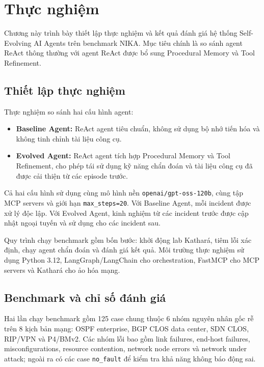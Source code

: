 \chapter{Thực nghiệm}
\label{chap:experiments}

Chương này trình bày thiết lập thực nghiệm và kết quả đánh giá hệ thống Self-Evolving AI Agents trên benchmark NIKA. Mục tiêu chính là so sánh agent ReAct thông thường với agent ReAct được bổ sung Procedural Memory và Tool Refinement.

\section{Thiết lập thực nghiệm}
\label{sec:experiment_setup}

Thực nghiệm so sánh hai cấu hình agent:
\begin{itemize}
    \item \textbf{Baseline Agent:} ReAct agent tiêu chuẩn, không sử dụng bộ nhớ tiến hóa và không tinh chỉnh tài liệu công cụ.
    \item \textbf{Evolved Agent:} ReAct agent tích hợp Procedural Memory và Tool Refinement, cho phép tái sử dụng kỹ năng chẩn đoán và tài liệu công cụ đã được cải thiện từ các episode trước.
\end{itemize}

Cả hai cấu hình sử dụng cùng mô hình nền \texttt{openai/gpt-oss-120b}, cùng tập MCP servers và giới hạn \texttt{max\_steps=20}. Với Baseline Agent, mỗi incident được xử lý độc lập. Với Evolved Agent, kinh nghiệm từ các incident trước được cập nhật ngoại tuyến và sử dụng cho các incident sau.

Quy trình chạy benchmark gồm bốn bước: khởi động lab Kathará, tiêm lỗi xác định, chạy agent chẩn đoán và đánh giá kết quả. Môi trường thực nghiệm sử dụng Python 3.12, LangGraph/LangChain cho orchestration, FastMCP cho MCP servers và Kathará cho ảo hóa mạng.

\section{Benchmark và chỉ số đánh giá}
\label{sec:benchmark_dataset}

Hai lần chạy benchmark gồm 125 case chung thuộc 6 nhóm nguyên nhân gốc rễ trên 8 kịch bản mạng: OSPF enterprise, BGP CLOS data center, SDN CLOS, RIP/VPN và P4/BMv2. Các nhóm lỗi bao gồm link failures, end-host failures, misconfigurations, resource contention, network node errors và network under attack; ngoài ra có các case \texttt{no\_fault} để kiểm tra khả năng không báo động sai.

